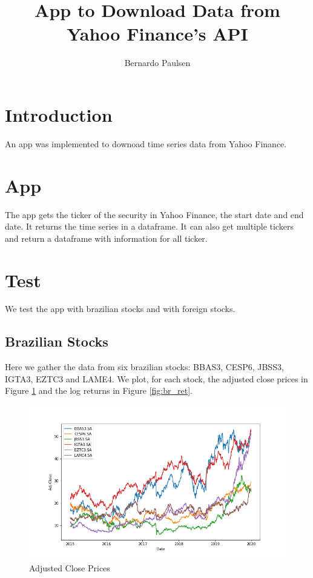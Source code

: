 \documentclass{article}
\title{App to Download Data from Yahoo Finance's API}
\author{Bernardo Paulsen}
\begin{document}
\maketitle

\section{Introduction}

An app was implemented to downoad time series data from Yahoo Finance.

\section{App}

The app gets the ticker of the security in Yahoo Finance, the start date and end date. It returns the time series in a dataframe. It can also get multiple tickers and return a dataframe with information for all ticker.

\section{Test}

We test the app with brazilian stocks and with foreign stocks.

\subsection{Brazilian Stocks} 

Here we gather the data from six brazilian stocks: BBAS3, CESP6, JBSS3, IGTA3, EZTC3 and LAME4. We plot, for each stock, the adjusted close prices in Figure \ref{fig:br_adj} and the log returns in Figure \ref{fig:br_ret}.

\begin{figure}[H]
	\caption{Adjusted Close Prices}
	\label{fig:br_adj}
	\centering
	\includegraphics[width=\textwidth]{adj_close.png}
\end{figure}
\end{document}
